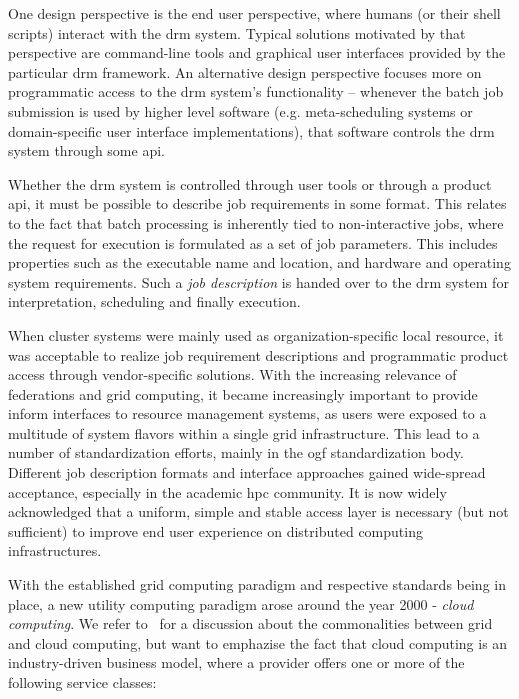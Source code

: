 \documentclass[twocolumn]{svjour3}       %
\begin{document}
One design perspective is the end user perspective, where humans (or their shell scripts) interact with the \gls{drm} system. Typical solutions motivated by that perspective are command-line tools and graphical user interfaces provided by the particular \gls{drm} framework. An alternative design perspective focuses more on programmatic access to the \gls{drm} system's functionality -- whenever the batch job submission is used by higher level software (e.g. meta-scheduling systems or domain-specific user interface implementations), that software controls the \gls{drm} system through some \gls{api}.

Whether the \gls{drm} system is controlled through user tools or through a product \gls{api}, it must be possible to describe job requirements in some format. This relates to the fact that batch processing is inherently tied to non-interactive jobs, where the request for execution is formulated as a set of job parameters. This includes properties such as the executable name and location, and hardware and operating system requirements. Such a \emph{job description} is handed over to the \gls{drm} system for interpretation, scheduling and finally execution. 

When cluster systems were mainly used as organization-specific local resource, it was acceptable to realize job requirement descriptions and programmatic product access through vendor-specific solutions. With the increasing relevance of federations and grid computing, it became increasingly important to provide inform interfaces to resource management systems, as users were exposed to a multitude of system flavors within a single grid infrastructure. This lead to a number of standardization efforts, mainly in the \gls{ogf} standardization body. Different job description formats and interface approaches gained wide-spread acceptance, especially in the academic \gls{hpc} community. It is now widely acknowledged that a uniform, simple and stable access layer is necessary (but not sufficient) to improve end user experience on distributed computing infrastructures.

With the established grid computing paradigm and respective standards being in place, a new utility computing paradigm arose around the year 2000 - \emph{cloud computing}. We refer to~\cite{citemaster_9642} for a discussion about the commonalities between grid and cloud computing, but want to emphazise the fact that cloud computing is an industry-driven business model, where a provider offers one or more of the following service classes:
\end{document}
